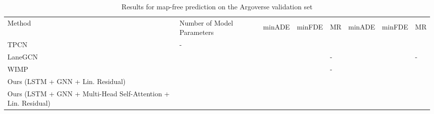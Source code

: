 \documentclass[letterpaper, 10 pt, conference]{ieeeconf}
\begin{document}
\begin{table*}[thpb]
\begin{minipage}{\columnwidth}
\begin{adjustbox}{clip, trim=0cm 0.1cm 0cm 0cm}
\end{pgfscope}\begin{pgfscope}\definecolor{textcolor}{rgb}{0.000000,0.000000,0.000000}\pgfsetstrokecolor{textcolor}\pgfsetfillcolor{textcolor}\pgftext[x=5.505050in,y=0.657253in,left,base]{\color{textcolor}\rmfamily\fontsize{16.000000}{19.200000}\selectfont Model includes map}\end{pgfscope}\end{pgfpicture}\makeatother \endgroup  }
		\end{adjustbox}
		\vspace{-0.6cm}
		\label{fig:performance_comparison}
	\end{minipage}
\end{table*} \begin{table*}[thpb]
	\caption{Results for map-free prediction on the Argoverse validation set}
	\label{tab:results_val}
	\setlength{\tabcolsep}{2.9pt}
	\centering
	\begin{tabularx}{1\textwidth}{Xlllllll}
		\toprule
		\multirow{2}{*}{Method}                                          & \multirow{2}{*}{Number of Model Parameters} &              \multicolumn{3}{c}{}              &              \multicolumn{3}{c}{}              \\
		                                                                 &                                             & minADE          & minFDE          & MR              & minADE          & minFDE          & MR              \\ \midrule
		TPCN \cite{Ye2021}                                               & -                                           &           &  &           &           &           &  \\
		LaneGCN \cite{Liang2020}                                         &                              &           &           & -               &  &  & -               \\
		WIMP \cite{Khandelwal2020_ARXIV}                                 &                           &           &           & -               &           &           &           \\ \midrule
		Ours (LSTM + GNN + Lin. Residual)                                &                         &           &           &           &           &           &           \\
		Ours (LSTM + GNN + Multi-Head Self-Attention + Lin. Residual)    &                                  &  &           &  &           &           &           \\ \bottomrule
	\end{tabularx}
\end{table*} 
\end{document}
